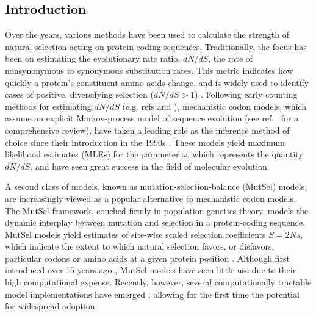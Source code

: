 \documentclass{pnastwo}
\begin{document}
\begin{article}

\section*{Introduction}

Over the years, various methods have been used to calculate the strength of natural selection acting on protein-coding sequences. Traditionally, the focus has been on estimating the evolutionary rate ratio, $dN/dS$, the rate of nonsynonymous to synonymous substitution rates. This metric indicates how quickly a protein's constituent amino acids change, and is widely used to identify cases of positive, diversifying selection ($dN/dS > 1$) \cite{NielsenYang1998, Yangetal2000, KosakovskyPondFrost2005, Huelsenbecketal2006}. Following early counting methods for estimating $dN/dS$ (e.g. refs \cite{LWL85} and \cite{NG86}), mechanistic codon models, which assume an explicit Markov-process model of sequence evolution (see ref.~\cite{Anisimova2009} for a comprehensive review), have taken a leading role as the inference method of choice since their introduction in the 1990s \cite{GoldmanYang1994, MuseGaut1994, NielsenYang1998}. These models yield maximum likelihood estimates (MLEs) for the parameter $\omega$, which represents the quantity $dN/dS$, and have seen great success in the field of molecular evolution. 

A second class of models, known as mutation-selection-balance (MutSel) models, are increasingly viewed as a popular alternative to mechanistic codon models. The MutSel framework, couched firmly in population genetics theory, models the dynamic interplay between mutation and selection in a protein-coding sequence. MutSel models yield estimates of site-wise scaled selection coefficients $S=2Ns$, which indicate the extent to which natural selection favors, or disfavors, particular codons or amino acids at a given protein position \cite{HalpernBruno1998,Rodrigueetal2010,Tamurietal2012,Thorne2012}. Although first introduced over 15 years ago \cite{HalpernBruno1998}, MutSel models have seen little use due to their high computational expense. Recently, however, several computationally tractable model implementations have emerged \cite{RodrigueLartillot2014,Tamurietal2014}, allowing for the first time the potential for widespread adoption. 



\end{article}
\end{document}
